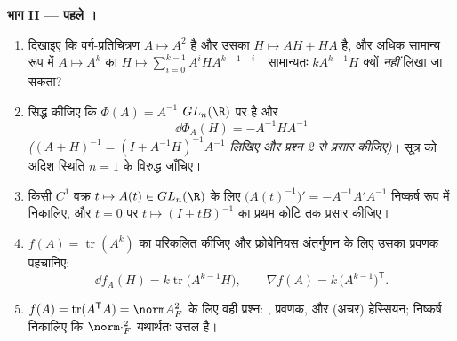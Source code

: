 \begin{problem}
\medskip
\noindent\textbf{भाग II --- पहले ।}
\begin{enumerate}[resume]
  \item दिखाइए कि वर्ग-प्रतिचित्रण $A \mapsto A^2$  है और उसका  $H \mapsto AH + HA$ है,
        और अधिक सामान्य रूप में $A \mapsto A^k$ का  $H \mapsto \sum_{i=0}^{k-1}
        A^iHA^{k-1-i}$। सामान्यतः $kA^{k-1}H$ क्यों
        \emph{नहीं} लिखा जा सकता?
  \item सिद्ध कीजिए कि $\Phi(A) = A^{-1}$ $GL_n(\R)$ पर  है और
        \[
        \dd\Phi_A(H) = -A^{-1}HA^{-1}
        \]
        \emph{($(A + H)^{-1} = (I + A^{-1}H)^{-1}A^{-1}$ लिखिए और प्रश्न 2 से प्रसार कीजिए)}। सूत्र को अदिश
        स्थिति $n = 1$ के विरुद्ध जाँचिए।
  \item किसी $C^1$ वक्र $t \mapsto A(t) \in GL_n(\R)$ के लिए $\bigl(A(t)^{-1}\bigr)' = -A^{-1}A'A^{-1}$ निष्कर्ष रूप में निकालिए, और $t = 0$
        पर $t \mapsto (I + tB)^{-1}$ का प्रथम कोटि तक प्रसार कीजिए।
  \item $f(A) =
        \operatorname{tr}(A^k)$ का  परिकलित कीजिए और फ्रोबेनियस अंतर्गुणन के लिए उसका
        प्रवणक पहचानिए:
        \[
        \dd f_A(H) = k\operatorname{tr}\bigl(A^{k-1}H\bigr),
        \qquad
        \nabla f(A) = k\,\bigl(A^{k-1}\bigr)^{\mathsf T} .
        \]
  \item $f(A) = \operatorname{tr}
        (A^{\mathsf T}A) = \norm A_F^2$ के लिए वही प्रश्न: , प्रवणक, और (अचर) हेस्सियन; निष्कर्ष
        निकालिए कि $\norm\cdot_F^2$ यथार्थतः उत्तल है।
\end{enumerate}


\end{problem}
